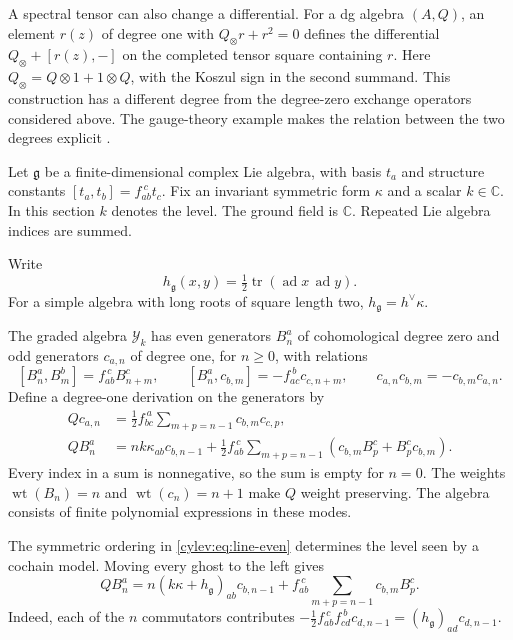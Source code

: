 A spectral tensor can also change a differential.
For a dg algebra $(A,Q)$, an element $r(z)$ of degree one with
$Q_\otimes r+r^2=0$ defines the differential
$Q_\otimes+[r(z),-]$ on the completed tensor square containing $r$.
Here $Q_\otimes=Q\otimes1+1\otimes Q$, with the Koszul sign in the
second summand. This construction has a different degree from the
degree-zero exchange operators considered above.
The gauge-theory example makes the relation between the two degrees
explicit \cite[\S\S6.5, 7.2]{DimofteNiuPy2025}.

Let $\mathfrak g$ be a finite-dimensional complex Lie algebra, with
basis $t_a$ and structure constants $[t_a,t_b]=f_{ab}^{\ c}t_c$.
Fix an invariant symmetric form $\kappa$ and a scalar $k\in\mathbb C$.
In this section $k$ denotes the level. The ground field is $\mathbb C$.
Repeated Lie algebra indices are summed.

Write
\[
 h_{\mathfrak g}(x,y)=\tfrac12\operatorname{tr}
                         (\operatorname{ad}x\,\operatorname{ad}y).
\]
For a simple algebra with long roots of square length two,
$h_{\mathfrak g}=h^\vee\kappa$.

\begin{definition}\label{cylev:def:line-algebra}
The graded algebra $\mathcal Y_k$ has even generators $B^a_n$ of
cohomological degree zero and odd generators $c_{a,n}$ of degree one,
for $n\ge0$, with relations
\begin{equation}\label{cylev:eq:line-relations}
 [B^a_n,B^b_m]=f_{ab}^{\ c}B^c_{n+m},\qquad
 [B^a_n,c_{b,m}]=-f_{ac}^{\ b}c_{c,n+m},\qquad
 c_{a,n}c_{b,m}=-c_{b,m}c_{a,n}.
\end{equation}
Define a degree-one derivation on the generators by
\begin{align}
 Qc_{a,n}
   &=\frac12f_{bc}^{\ a}\sum_{m+p=n-1}c_{b,m}c_{c,p},
       \label{cylev:eq:line-ghost}\\
 QB^a_n
   &=nk\kappa_{ab}c_{b,n-1}
     +\frac12f_{ab}^{\ c}\sum_{m+p=n-1}
                   (c_{b,m}B^c_p+B^c_pc_{b,m}).
       \label{cylev:eq:line-even}
\end{align}
Every index in a sum is nonnegative, so the sum is empty for $n=0$.
The weights $\operatorname{wt}(B_n)=n$ and
$\operatorname{wt}(c_n)=n+1$ make $Q$ weight preserving.
The algebra consists of finite polynomial expressions in these modes.
\end{definition}

The symmetric ordering in \eqref{cylev:eq:line-even} determines the
level seen by a cochain model.
Moving every ghost to the left gives
\begin{equation}\label{cylev:eq:line-shift}
 QB^a_n=n(k\kappa+h_{\mathfrak g})_{ab}c_{b,n-1}
       +f_{ab}^{\ c}\sum_{m+p=n-1}c_{b,m}B^c_p.
\end{equation}
Indeed, each of the $n$ commutators contributes
$-\frac12f_{ab}^{\ c}f_{cd}^{\ b}c_{d,n-1}
=(h_{\mathfrak g})_{ad}c_{d,n-1}$.

